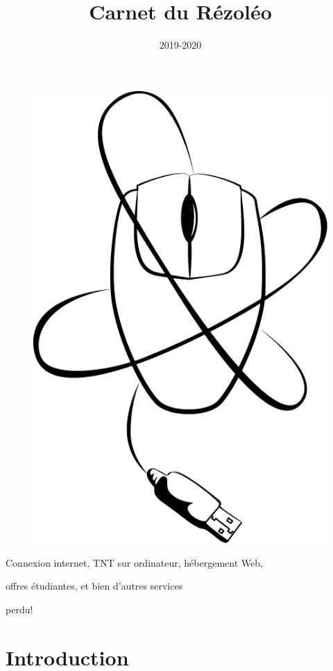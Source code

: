 \documentclass[12pt]{article}
\begin{document}
\title{Carnet du Rézoléo}
\author{}
\date{2019-2020}
\maketitle
\vspace*{1cm}
\begin{figure}[h!]
\centerline{\includegraphics[scale=0.35]{rezoleo.png}}
\end{figure}
\vspace*{1cm}

\centerline{Connexion internet, TNT sur ordinateur, hébergement Web,}
\centerline{offres étudiantes, et bien d'autres services}

\newpage
\color{white}
perdu!
\newpage
\color{black}
\section{Introduction}
\end{document}
